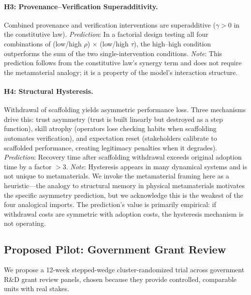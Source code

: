 \documentclass[runningheads]{llncs}
\begin{document}
\paragraph{H3: Provenance--Verification Superadditivity.}
Combined provenance and verification interventions are superadditive ($\gamma > 0$ in the constitutive law). \emph{Prediction}: In a factorial design testing all four combinations of (low/high $\rho$) $\times$ (low/high $\tau$), the high--high condition outperforms the sum of the two single-intervention conditions. \emph{Note}: This prediction follows from the constitutive law's synergy term and does not require the metamaterial analogy; it is a property of the model's interaction structure.

\paragraph{H4: Structural Hysteresis.}
Withdrawal of scaffolding yields asymmetric performance loss. Three mechanisms drive this: trust asymmetry (trust is built linearly but destroyed as a step function), skill atrophy (operators lose checking habits when scaffolding automates verification), and expectation reset (stakeholders calibrate to scaffolded performance, creating legitimacy penalties when it degrades). \emph{Prediction}: Recovery time after scaffolding withdrawal exceeds original adoption time by a factor $>3$. \emph{Note}: Hysteresis appears in many dynamical systems and is not unique to metamaterials. We invoke the metamaterial framing here as a heuristic---the analogy to structural memory in physical metamaterials motivates the specific asymmetry prediction, but we acknowledge this is the weakest of the four analogical imports. The prediction's value is primarily empirical: if withdrawal costs are symmetric with adoption costs, the hysteresis mechanism is not operating.

\subsection{Proposed Pilot: Government Grant Review}

We propose a 12-week stepped-wedge cluster-randomized trial across government R\&D grant review panels, chosen because they provide controlled, comparable units with real stakes.
\end{document}
